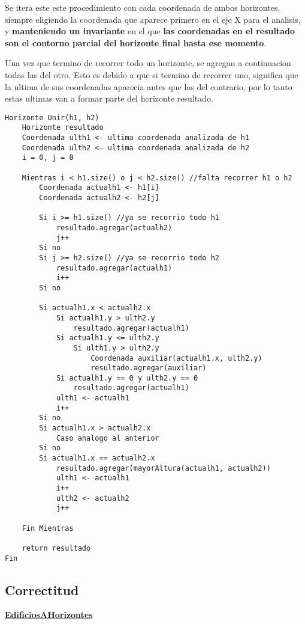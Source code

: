 Se itera este este procedimiento con cada coordenada de ambos horizontes, siempre eligiendo la coordenada que aparece primero en el eje X para el analisis, y \textbf{manteniendo un invariante} en el que \textbf{las coordenadas en el resultado son el contorno parcial del horizonte final hasta ese momento}.

Una vez que termino de recorrer todo un horizonte, se agregan a continuacion todas las del otro. Esto es debido a que si termino de recorrer uno, significa que la ultima de sus coordenadas aparecia antes que las del contrario, por lo tanto estas ultimas van a formar parte del horizonte resultado.
\bigskip
\begin{lstlisting}
Horizonte Unir(h1, h2)
	Horizonte resultado
	Coordenada ulth1 <- ultima coordenada analizada de h1
	Coordenada ulth2 <- ultima coordenada analizada de h2
	i = 0, j = 0

	Mientras i < h1.size() o j < h2.size() //falta recorrer h1 o h2
		Coordenada actualh1 <- h1[i]
		Coordenada actualh2 <- h2[j]
		
		Si i >= h1.size() //ya se recorrio todo h1
			resultado.agregar(actualh2)
			j++
		Si no
		Si j >= h2.size() //ya se recorrio todo h2
			resultado.agregar(actualh1)
			i++
		Si no
		
		Si actualh1.x < actualh2.x
			Si actualh1.y > ulth2.y
				resultado.agregar(actualh1)
			Si actualh1.y <= ulth2.y
				Si ulth1.y > ulth2.y
					Coordenada auxiliar(actualh1.x, ulth2.y)
					resultado.agregar(auxiliar)
			Si actualh1.y == 0 y ulth2.y == 0
				resultado.agregar(actualh1)
			ulth1 <- actualh1
			i++
		Si no		
		Si actualh1.x > actualh2.x
			Caso analogo al anterior
		Si no		
		Si actualh1.x == actualh2.x
			resultado.agregar(mayorAltura(actualh1, actualh2))
			ulth1 <- actualh1
			i++
			ulth2 <- actualh2
			j++
			
	Fin Mientras
	
	return resultado
Fin	
\end{lstlisting}


\newpage
\subsection{Correctitud}

\noindent \underline{\textbf{EdificiosAHorizontes}}

